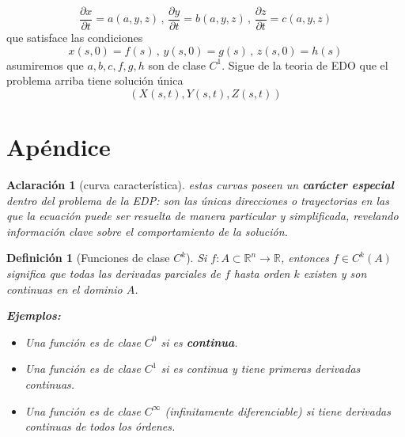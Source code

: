 \documentclass{article}
\newtheorem{definition}{Definición}
\newtheorem{Acla}{Aclaración}
\begin{document}
\begin{equation*}
    \frac{\partial x}{\partial t}=a(a,y,z)\, ,\, \frac{\partial y}{\partial t}=b(a,y,z)\, ,\, \frac{\partial z}{\partial t}=c(a,y,z)
\end{equation*}
que satisface las condiciones
\begin{equation*}
    x(s,0)=f(s)\, ,\, y(s,0)=g(s)\, ,\, z(s,0)=h(s)
\end{equation*}
asumiremos que $a,b,c,f,g,h$ son de clase $C^1$. Sigue de la teoria de EDO que el problema arriba tiene solución única
\begin{equation*}
    (X(s,t),Y(s,t),Z(s,t))
\end{equation*}
\section{Apéndice}
\begin{Acla}[curva característica]\label{caracteristica}
    estas curvas poseen un \textbf{carácter especial} dentro del problema de la EDP: son las únicas direcciones o trayectorias en las que la ecuación puede ser resuelta de manera particular y simplificada, revelando información clave sobre el comportamiento de la solución.
\end{Acla}
\begin{definition}[Funciones de clase $C^k$]\label{claseCk}
    Si \( f : A \subset \mathbb{R}^n \to \mathbb{R} \), entonces \( f \in C^k(A) \) significa que todas las derivadas parciales de \( f \) hasta orden \( k \) existen y son continuas en el dominio \( A \).

\textbf{ Ejemplos:}
\begin{itemize}
    \item Una función es de clase \( C^0 \) si es \textbf{continua}.
    \item Una función es de clase \( C^1 \) si es continua y tiene primeras derivadas continuas.
    \item Una función es de clase \( C^\infty \) (infinitamente diferenciable) si tiene derivadas continuas de todos los órdenes.
\end{itemize}
\end{definition}
\end{document}
